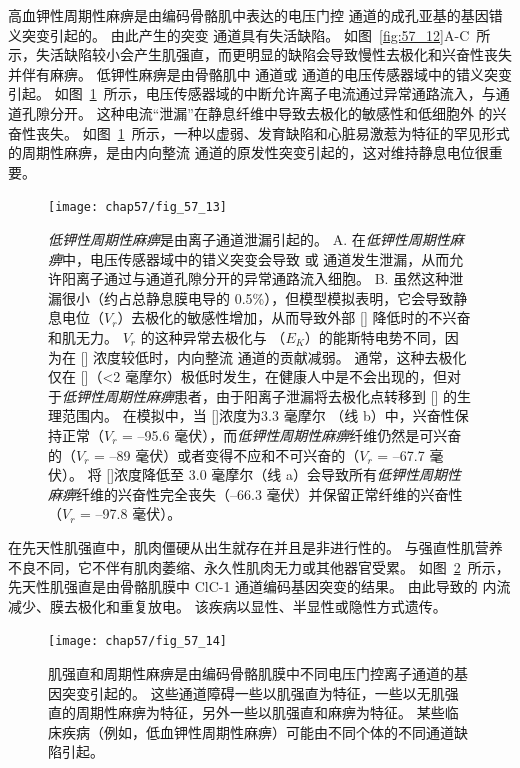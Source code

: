 高血钾性周期性麻痹是由编码骨骼肌中表达的电压门控  通道的成孔亚基的基因错义突变引起的。
由此产生的突变  通道具有失活缺陷。
如图~\ref{fig:57_12}A-C~所示，失活缺陷较小会产生肌强直，而更明显的缺陷会导致慢性去极化和兴奋性丧失并伴有麻痹。
低钾性麻痹是由骨骼肌中  通道或  通道的电压传感器域中的错义突变引起。
如图~\ref{fig:57_13}~所示，电压传感器域的中断允许离子电流通过异常通路流入，与通道孔隙分开。
这种电流“泄漏”在静息纤维中导致去极化的敏感性和低细胞外  的兴奋性丧失。
如图~\ref{fig:57_13}~所示，一种以虚弱、发育缺陷和心脏易激惹为特征的罕见形式的周期性麻痹，是由内向整流  通道的原发性突变引起的，这对维持静息电位很重要。


\begin{figure}[htbp]
	\centering
	\texttt{[image: chap57/fig\_57\_13]}
	\caption{\textit{低钾性周期性麻痹}是由离子通道泄漏引起的。
		A. 在\textit{低钾性周期性麻痹}中，电压传感器域中的错义突变会导致  或  通道发生泄漏，从而允许阳离子通过与通道孔隙分开的异常通路流入细胞。
		B. 虽然这种泄漏很小（约占总静息膜电导的 0.5\%），但模型模拟表明，它会导致静息电位（$V_r$）去极化的敏感性增加，从而导致外部 [] 降低时的不兴奋和肌无力。
		$V_r$ 的这种异常去极化与 （$E_K$）的能斯特电势不同，因为在 [] 浓度较低时，内向整流  通道的贡献减弱。
		通常，这种去极化仅在 []（<2 毫摩尔）极低时发生，在健康人中是不会出现的，但对于\textit{低钾性周期性麻痹}患者，由于阳离子泄漏将去极化点转移到 [] 的生理范围内。
		在模拟中，当 []浓度为3.3 毫摩尔 （线 b）中，兴奋性保持正常（$V_r$ = –95.6 毫伏），而\textit{低钾性周期性麻痹}纤维仍然是可兴奋的（$V_r$ = –89 毫伏）或者变得不应和不可兴奋的（$V_r$ = –67.7 毫伏）。
		将 []浓度降低至 3.0 毫摩尔（线 a）会导致所有\textit{低钾性周期性麻痹}纤维的兴奋性完全丧失（–66.3 毫伏）并保留正常纤维的兴奋性（$V_r$ = –97.8 毫伏）\cite{cannon2018sodium}。}
	\label{fig:57_13}
\end{figure}


在先天性肌强直中，肌肉僵硬从出生就存在并且是非进行性的。
与强直性肌营养不良不同，它不伴有肌肉萎缩、永久性肌肉无力或其他器官受累。
如图~\ref{fig:57_14}~所示，先天性肌强直是由骨骼肌膜中 ClC-1  通道编码基因突变的结果。
由此导致的  内流减少、膜去极化和重复放电。
该疾病以显性、半显性或隐性方式遗传。


\begin{figure}[htbp]
	\centering
	\texttt{[image: chap57/fig\_57\_14]}
	\caption{肌强直和周期性麻痹是由编码骨骼肌膜中不同电压门控离子通道的基因突变引起的。
		这些通道障碍一些以肌强直为特征，一些以无肌强直的周期性麻痹为特征，另外一些以肌强直和麻痹为特征。
		某些临床疾病（例如，低血钾性周期性麻痹）可能由不同个体的不同通道缺陷引起。}
	\label{fig:57_14}
\end{figure}



